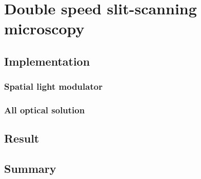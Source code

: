 \section{Double speed slit-scanning microscopy}
\subsection{Implementation} %
\subsubsection{Spatial light modulator} %
\subsubsection{All optical solution} %
\subsection{Result}
\subsection{Summary}
